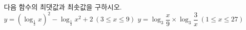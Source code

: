 다음 함수의 최댓값과 최솟값을 구하시오.
 $y=(\log_{\frac{1}{3}} x)^2-\log_{\frac{1}{3}} x^2+2\ (3\le x\le 9)$
 $y=\log_3 \dfrac{x}{9}\times\log_3 \dfrac{3}{x}\ (1\le x\le 27)$
